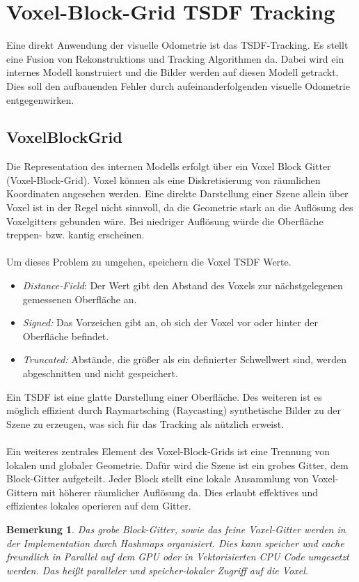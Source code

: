 \documentclass[12pt,DIV=15,BCOR=15mm,twoside,headsepline,abstract=true,listof=totoc,bibliography=totoc]{scrreprt}
\newtheorem{remark}{Bemerkung}[chapter]
\theoremstyle{remark}    %
\begin{document}
    \section{Voxel-Block-Grid TSDF Tracking}
    Eine direkt Anwendung der visuelle Odometrie ist das \ac{TSDF}-Tracking. Es stellt eine Fusion von Rekonstruktions und Tracking Algorithmen da.
    Dabei wird ein internes Modell konstruiert und die Bilder werden auf diesen Modell getrackt. Dies soll den aufbauenden Fehler durch aufeinanderfolgenden visuelle Odometrie entgegenwirken.
    \subsection{VoxelBlockGrid}
    Die Representation des internen Modells erfolgt über ein Voxel Block Gitter (Voxel-Block-Grid). 
    Voxel können als eine Diskretisierung von räumlichen Koordinaten angesehen werden. Eine direkte Darstellung einer Szene allein über 
    Voxel ist in der Regel nicht sinnvoll, da die Geometrie stark an die Auflösung des Voxelgitters gebunden wäre. Bei niedriger Auflösung würde die 
    Oberfläche treppen- bzw. kantig erscheinen.\\\\
    Um dieses Problem zu umgehen, speichern die Voxel \ac{TSDF} Werte. 
    \begin{itemize}
        \item \emph{Distance-Field}: Der Wert gibt den Abstand des Voxels zur nächstgelegenen gemessenen Oberfläche an.
        \item \emph{Signed:} Das Vorzeichen gibt an, ob sich der Voxel vor oder hinter der Oberfläche befindet.
        \item \emph{Truncated:}  Abstände, die größer als ein definierter Schwellwert sind, werden abgeschnitten und nicht gespeichert.
    \end{itemize}
    Ein \ac{TSDF} ist eine glatte Darstellung einer Oberfläche. 
    Des weiteren ist es möglich effizient durch Raymartsching (Raycasting) synthetische Bilder zu der Szene zu erzeugen, was sich für das Tracking als 
    nützlich erweist.\cite{dong2023ashmodernframeworkparallel}\\\\  
    Ein weiteres zentrales Element des Voxel-Block-Grids ist eine Trennung von lokalen und globaler Geometrie. Dafür wird die Szene ist ein grobes Gitter, 
    dem Block-Gitter aufgeteilt. Jeder Block stellt eine lokale Ansammlung von Voxel-Gittern mit höherer räumlicher Auflösung da. Dies erlaubt effektives 
    und effizientes lokales operieren auf dem Gitter.
    \begin{remark}
    Das grobe Block-Gitter, sowie das feine Voxel-Gitter werden in der Implementation durch Hashmaps organisiert. Dies kann speicher und 
    cache freundlich in Parallel auf dem GPU oder in Vektorisierten CPU Code umgesetzt werden. Das heißt paralleler und speicher-lokaler Zugriff auf die 
    Voxel. \cite{dong2023ashmodernframeworkparallel}
    \end{remark}
\end{document}
